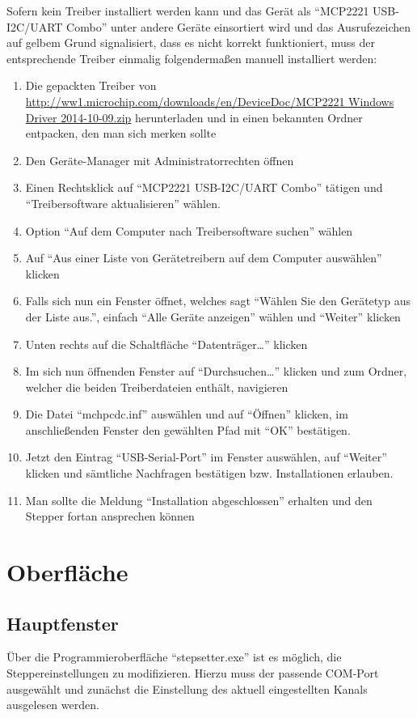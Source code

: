 \documentclass[paper=a4, open=any]{scrbook}
\begin{document}
			Sofern kein Treiber installiert werden kann und das Gerät als \enquote{MCP2221 USB-I2C/UART Combo} unter andere Geräte einsortiert wird und das Ausrufezeichen auf gelbem Grund signalisiert, dass es nicht korrekt funktioniert, muss der entsprechende Treiber einmalig folgendermaßen manuell installiert werden:
			\begin{enumerate}
				\item Die gepackten Treiber von \url{http://ww1.microchip.com/downloads/en/DeviceDoc/MCP2221 Windows Driver 2014-10-09.zip} herunterladen und in einen bekannten Ordner entpacken, den man sich merken sollte
				\item Den Geräte-Manager mit Administratorrechten öffnen
				\item Einen Rechtsklick auf \enquote{MCP2221 USB-I2C/UART Combo} tätigen und \enquote{Treibersoftware aktualisieren} wählen.
				\item Option \enquote{Auf dem Computer nach Treibersoftware suchen} wählen
				\item Auf \enquote{Aus einer Liste von Gerätetreibern auf dem Computer auswählen} klicken
				\item Falls sich nun ein Fenster öffnet, welches sagt \enquote{Wählen Sie den Gerätetyp aus der Liste aus.}, einfach \enquote{Alle Geräte anzeigen} wählen und \enquote{Weiter} klicken
				\item Unten rechts auf die Schaltfläche \enquote{Datenträger\dots} klicken
				\item Im sich nun öffnenden Fenster auf \enquote{Durchsuchen\dots} klicken und zum Ordner, welcher die beiden Treiberdateien enthält, navigieren
				\item Die Datei \enquote{mchpcdc.inf} auswählen und auf \enquote{Öffnen} klicken, im anschließenden Fenster den gewählten Pfad mit \enquote{OK} bestätigen.
				\item Jetzt den Eintrag \enquote{USB-Serial-Port} im Fenster auswählen, auf \enquote{Weiter} klicken und sämtliche Nachfragen bestätigen bzw. Installationen erlauben.
				\item Man sollte die Meldung \enquote{Installation abgeschlossen} erhalten und den Stepper fortan ansprechen können
			\end{enumerate}

		\section{Oberfläche}
			\subsection{Hauptfenster}
				Über die Programmieroberfläche \enquote{stepsetter.exe} ist es möglich, die Steppereinstellungen zu modifizieren. Hierzu muss der passende COM-Port ausgewählt und zunächst die Einstellung des aktuell eingestellten Kanals ausgelesen werden.
\end{document}
